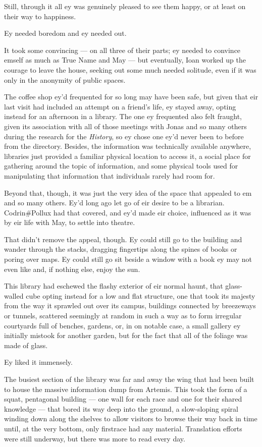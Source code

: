 Still, through it all ey was genuinely pleased to see them happy, or at least on their way to happiness.

Ey needed boredom and ey needed out.

It took some convincing — on all three of their parts; ey needed to convince emself as much as True Name and May — but eventually, Ioan worked up the courage to leave the house, seeking out some much needed solitude, even if it was only in the anonymity of public spaces.

The coffee shop ey'd frequented for so long may have been safe, but given that eir last visit had included an attempt on a friend's life, ey stayed away, opting instead for an afternoon in a library. The one ey frequented also felt fraught, given its association with all of those meetings with Jonas and so many others during the research for the \emph{History}, so ey chose one ey'd never been to before from the directory. Besides, the information was technically available anywhere, libraries just provided a familiar physical location to access it, a social place for gathering around the topic of information, and some physical tools used for manipulating that information that individuals rarely had room for.

Beyond that, though, it was just the very idea of the space that appealed to em and so many others. Ey'd long ago let go of eir desire to be a librarian. Codrin\#Pollux had that covered, and ey'd made eir choice, influenced as it was by eir life with May, to settle into theatre.

That didn't remove the appeal, though. Ey could still go to the building and wander through the stacks, dragging fingertips along the spines of books or poring over maps. Ey could still go sit beside a window with a book ey may not even like and, if nothing else, enjoy the sun.

This library had eschewed the flashy exterior of eir normal haunt, that glass-walled cube opting instead for a low and flat structure, one that took its majesty from the way it sprawled out over its campus, buildings connected by breezeways or tunnels, scattered seemingly at random in such a way as to form irregular courtyards full of benches, gardens, or, in on notable case, a small gallery ey initially mistook for another garden, but for the fact that all of the foliage was made of glass.

Ey liked it immensely.

The busiest section of the library was far and away the wing that had been built to house the massive information dump from Artemis. This took the form of a squat, pentagonal building — one wall for each race and one for their shared knowledge — that bored its way deep into the ground, a slow-sloping spiral winding down along the shelves to allow visitors to browse their way back in time until, at the very bottom, only firstrace had any material. Translation efforts were still underway, but there was more to read every day.

